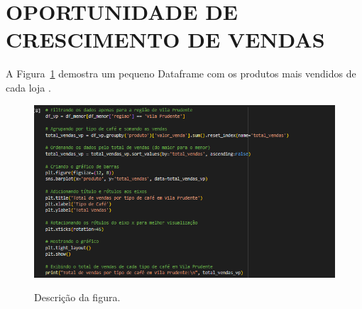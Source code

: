 \section{OPORTUNIDADE DE CRESCIMENTO DE VENDAS}
	\label{sec:identificao}
\label{sec:figura}
A Figura~\ref{figuras/figuras/configuraçao-oportunidade-crescimento.png} demostra um pequeno Dataframe com os produtos mais vendidos de cada loja .
\begin{figure}[!ht]
	{\centering
		\caption{Descrição da figura.}
		\includegraphics[width=1.0\textwidth]{figuras/configuraçao-oportunidade-crescimento.png}
		\label{figuras/figuras/configuraçao-oportunidade-crescimento.png}
	}
\end{figure} \\ \\ \\ \\ \\ \\ \\  \\ \\ \\ \\ \\ 

